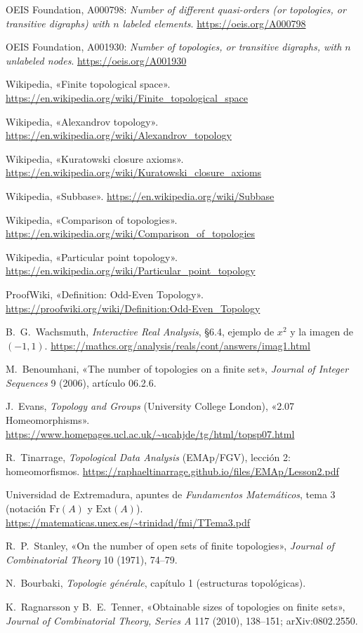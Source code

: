 \begin{enumerate}[label={[\arabic*]},leftmargin=2.6em,itemsep=0.3em,start=11]\small\sloppy
\item OEIS Foundation, A000798: \emph{Number of different quasi-orders (or topologies, or transitive digraphs) with
$n$ labeled elements}. \url{https://oeis.org/A000798}
\item OEIS Foundation, A001930: \emph{Number of topologies, or transitive digraphs, with $n$ unlabeled nodes}.
\url{https://oeis.org/A001930}
\item Wikipedia, «Finite topological space». \url{https://en.wikipedia.org/wiki/Finite_topological_space}
\item Wikipedia, «Alexandrov topology». \url{https://en.wikipedia.org/wiki/Alexandrov_topology}
\item Wikipedia, «Kuratowski closure axioms». \url{https://en.wikipedia.org/wiki/Kuratowski_closure_axioms}
\item Wikipedia, «Subbase». \url{https://en.wikipedia.org/wiki/Subbase}
\item Wikipedia, «Comparison of topologies». \url{https://en.wikipedia.org/wiki/Comparison_of_topologies}
\item Wikipedia, «Particular point topology». \url{https://en.wikipedia.org/wiki/Particular_point_topology}
\item ProofWiki, «Definition: Odd-Even Topology». \url{https://proofwiki.org/wiki/Definition:Odd-Even_Topology}
\item B.~G.~Wachsmuth, \emph{Interactive Real Analysis}, §6.4, ejemplo de $x^2$ y la imagen de $(-1,1)$.
\url{https://mathcs.org/analysis/reals/cont/answers/imag1.html}
\item M.~Benoumhani, «The number of topologies on a finite set», \emph{Journal of Integer Sequences} 9 (2006),
artículo 06.2.6.
\item J.~Evans, \emph{Topology and Groups} (University College London), «2.07 Homeomorphisms».
\url{https://www.homepages.ucl.ac.uk/~ucahjde/tg/html/topsp07.html}
\item R.~Tinarrage, \emph{Topological Data Analysis} (EMAp/FGV), lección 2: homeomorfismos.
\url{https://raphaeltinarrage.github.io/files/EMAp/Lesson2.pdf}
\item Universidad de Extremadura, apuntes de \emph{Fundamentos Matemáticos}, tema 3 (notación $\mathrm{Fr}(A)$ y
$\mathrm{Ext}(A)$). \url{https://matematicas.unex.es/~trinidad/fmi/TTema3.pdf}
\item R.~P.~Stanley, «On the number of open sets of finite topologies», \emph{Journal of Combinatorial Theory} 10
(1971), 74--79.
\item N.~Bourbaki, \emph{Topologie générale}, capítulo 1 (estructuras topológicas).
\item K.~Ragnarsson y B.~E.~Tenner, «Obtainable sizes of topologies on finite sets», \emph{Journal of Combinatorial
Theory, Series A} 117 (2010), 138--151; arXiv:0802.2550.
\end{enumerate}
